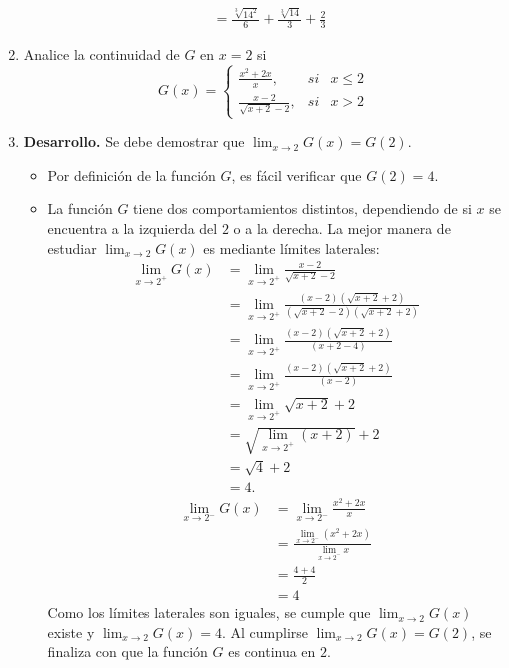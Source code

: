 \documentclass[10pt]{article}
\newcommand{\2}[1]{\hspace{-0.93cm}\colorbox{color1}{\hspace{0.07cm} \parbox{17cm}{\vspace{0.2cm} #1}\hspace*{0.07cm} }}
\newcommand{\3}[1]{\hspace{-0.93cm}\colorbox{color7}{\hspace{0.07cm} \parbox{17cm}{\vspace{0.2cm} #1}\hspace*{0.07cm} }}
\theoremstyle{theorem}
\numberwithin{equation}{section}
\newcommand{\dis}{\displaystyle}
\begin{document}
\begin{enumerate}[1.]
\begin{align*}
                                           &=\frac{\sqrt[3]{14^2}}{6}+\frac{\sqrt[3]{14}}{3}+\frac{2}{3} 
  \end{align*}
  \item Analice la continuidad de $G$ en $x=2$ si $$G(x)=\left\lbrace  \begin{array}{ccc}
\dis \frac{x^2+2x}{x},&si& x\leq 2\\ \dis \frac{x-2}{\sqrt{x+2}-2}  ,&si& x>2 
\end{array}        \right.$$
  \item[]\textbf{Desarrollo.} Se debe demostrar que $\dis \lim_{x\to 2}G(x)=G(2)$.
  \begin{itemize}
    \item Por definici\'on de la funci\'on $G$, es f\'acil verificar que $G(2)=4$.
    \item La funci\'on $G$ tiene dos comportamientos distintos, dependiendo de si $x$ se encuentra a la izquierda del $2$ o a la derecha. La mejor manera de estudiar $\dis \lim_{x\to 2}G(x)$ es mediante l\'imites laterales:
    \begin{align*}
    \dis \lim_{x\to 2^+}G(x)&=\lim_{x\to 2^+}\frac{x-2}{\sqrt{x+2}-2}\\
                            &=\lim_{x\to 2^+}\frac{(x-2)(\sqrt{x+2}+2)}{(\sqrt{x+2}-2)(\sqrt{x+2}+2)}\\
                            &=\lim_{x\to 2^+}\frac{(x-2)(\sqrt{x+2}+2)}{(x+2-4)}\\
                            &=\lim_{x\to 2^+}\frac{(x-2)(\sqrt{x+2}+2)}{(x-2)}\\
                            &=\lim_{x\to 2^+}\sqrt{x+2}+2\\
                            &=\sqrt{\lim_{x\to 2^+}(x+2)}+2\\
                            &=\sqrt{4}+2\\
                            &=4.
    \end{align*}
    \begin{align*}
    \dis \lim_{x\to 2^-}G(x)&=\lim_{x\to 2^-}\frac{x^2+2x}{x}\\
                            &=\frac{\lim_{x\to 2^-}(x^2+2x)}{\lim_{x\to 2^-}x}\\
                            &=\frac{4+4}{2}\\
                            &=4
    \end{align*}        
    Como los l\'imites laterales son iguales, se cumple que $\dis\lim_{x\to 2}G(x)$ existe y $\dis\lim_{x\to 2}G(x)=4$. Al cumplirse $\dis\lim_{x\to 2}G(x)=G(2)$, se finaliza con que la funci\'on $G$ es continua en $2$.
  \end{itemize}
\end{enumerate}
\end{document}
